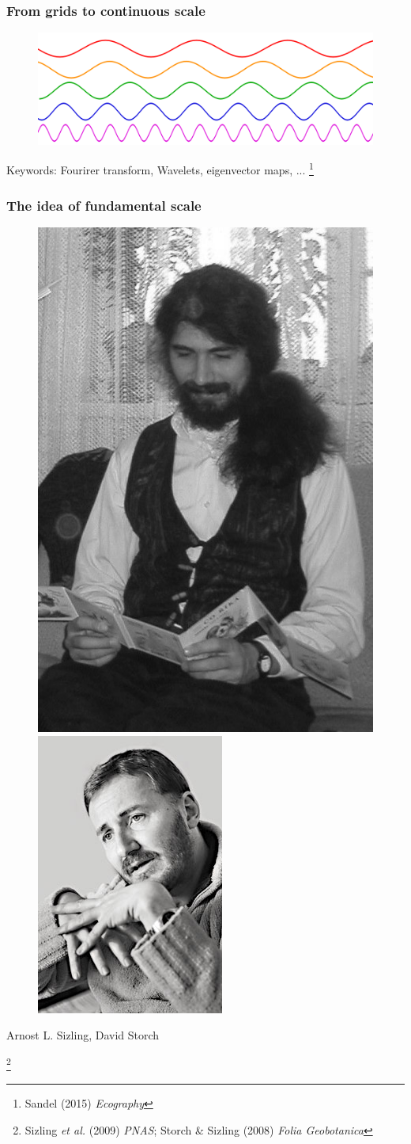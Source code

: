 \documentclass[xcolor=x11names, compress]{beamer}
\renewcommand{\(}{\begin{columns}}
\renewcommand{\)}{\end{columns}}
\newcommand{\<}[1]{\begin{column}{#1}}
\renewcommand{\>}{\end{column}}
\begin{document}
\begin{frame}
\frametitle{From grids to \textbf{continuous scale}}
\begin{figure}
	\includegraphics[height=0.3\linewidth]{fig/freq.png}
\end{figure}
Keywords: Fourirer transform, Wavelets, eigenvector maps, ...
\let\thefootnote\relax\footnote{Sandel (2015) \textit{Ecography}}
\end{frame}



\begin{frame}
\frametitle{The idea of \textbf{fundamental scale}}

\begin{figure}
\includegraphics[height=0.3\linewidth]{fig/arnost.png}
\includegraphics[height=0.3\linewidth]{fig/david.png}
\end{figure}
\centerline{Arnost L. Sizling, David Storch}

\let\thefootnote\relax\footnote{Sizling \textit{et al.} (2009) \textit{PNAS}; Storch \& Sizling (2008) \textit{Folia Geobotanica}}

\end{frame}
\end{document}
